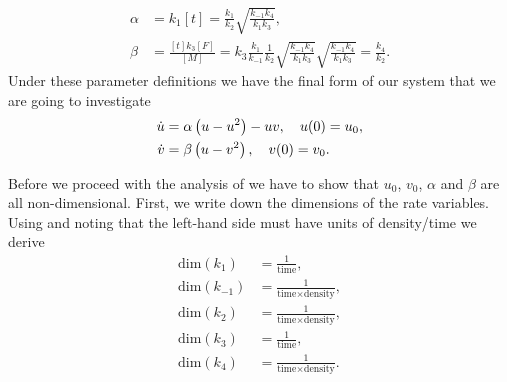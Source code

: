 \begin{example}[frametitle=Fishing]
{\begin{align}
\alpha&=k_1[t]=\frac{k_1}{k_2}\sqrt{\frac{k_{-1}k_4}{k_1k_3}},\nonumber\\
\beta&=\frac{[t]k_3[F]}{[M]}=k_3\frac{k_1}{k_{-1}}\frac{1}{k_2}\sqrt{\frac{k_{-1}k_4}{k_1k_3}}\sqrt{\frac{k_{-1}k_4}{k_1k_3}}=\frac{k_4}{k_2}.\nonumber
\end{align}
Under these parameter definitions we have the final form of our system that we are going to investigate
\begin{align}
\dot{u}&=\alpha\left( u-u^2\right)-uv, \quad u(0)=u_0,\label{Non_dim_fish_1}\\
\dot{v}&=\beta\left( u-v^2\right),\quad v(0)=v_0.\label{Non_dim_fish_2}
\end{align}

Before we proceed with the analysis of  we have to show that $u_0$, $v_0$, $\alpha$ and $\beta$ are all non-dimensional. First, we write down the dimensions of the rate variables. Using  and noting that the left-hand side must have units of density/time we derive
\begin{align}
\textrm{dim}(k_1)&=\frac{1}{\textrm{time}},\nonumber\\
\textrm{dim}(k_{-1})&=\frac{1}{\textrm{time}\times \textrm{density}},\nonumber\\
\textrm{dim}(k_{2})&=\frac{1}{\textrm{time}\times \textrm{density}},\nonumber\\
\textrm{dim}(k_{3})&=\frac{1}{\textrm{time}},\nonumber\\
\textrm{dim}(k_{4})&=\frac{1}{\textrm{time}\times \textrm{density}}.\nonumber
\end{align}
}
\end{example}
